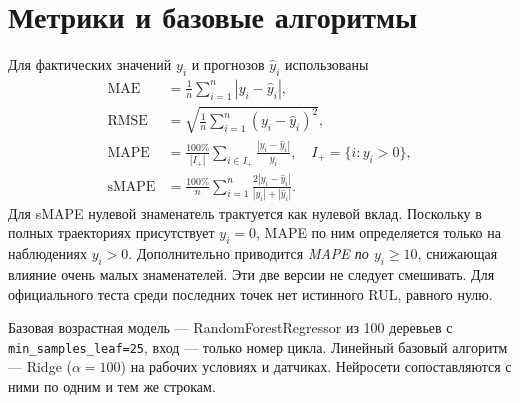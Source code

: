\documentclass[12pt,a4paper]{article}
\begin{document}
\section{Метрики и базовые алгоритмы}
Для фактических значений $y_i$ и прогнозов $\hat y_i$ использованы
\begin{align}
\mathrm{MAE}&=\frac1n\sum_{i=1}^n|y_i-\hat y_i|,\\
\mathrm{RMSE}&=\sqrt{\frac1n\sum_{i=1}^n(y_i-\hat y_i)^2},\\
\mathrm{MAPE}&=\frac{100\%}{|I_+|}\sum_{i\in I_+}\frac{|y_i-\hat y_i|}{y_i},\quad I_+=\{i:y_i>0\},\\
\mathrm{sMAPE}&=\frac{100\%}{n}\sum_{i=1}^n\frac{2|y_i-\hat y_i|}{|y_i|+|\hat y_i|}.
\end{align}
Для sMAPE нулевой знаменатель трактуется как нулевой вклад. Поскольку в полных траекториях присутствует $y_i=0$, MAPE по ним определяется только на наблюдениях $y_i>0$. Дополнительно приводится \emph{MAPE по $y_i\geq10$}, снижающая влияние очень малых знаменателей. Эти две версии не следует смешивать. Для официального теста среди последних точек нет истинного RUL, равного нулю.

Базовая возрастная модель — RandomForestRegressor из 100 деревьев с \texttt{min\_samples\_leaf=25}, вход — только номер цикла. Линейный базовый алгоритм — Ridge ($\alpha=100$) на рабочих условиях и датчиках. Нейросети сопоставляются с ними по одним и тем же строкам.
\end{document}
